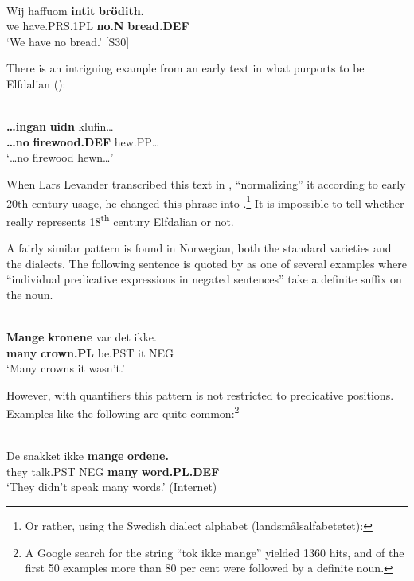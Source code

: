 \ea \label{} 
\\
\gll Wij  haffuom  \textbf{intit} \textbf{brödith.}\\
we  have.PRS.1PL  \textbf{no.N} \textbf{bread.DEF}\\
\glt ‘We have no bread.’ [S30]

\z

There is an intriguing example from an early text in what purports to be Elfdalian (\citet{Näsman1733}):

\ea \label{} 
\\
\gll \textbf{…ingan} \textbf{uidn} klufin…\\
\textbf{…no} \textbf{firewood.DEF} hew.PP…\\
\glt ‘…no firewood hewn…’

\z

When Lars Levander transcribed this text in \citet[T117]{Lundell1936}, “normalizing” it according to early 20th century usage, he changed this phrase into .\footnote{ Or rather, using the Swedish dialect alphabet (landsmålsalfabetetet):  }\textit{ }It is impossible to tell whether  really represents 18\textsuperscript{th} century Elfdalian or not. 

A fairly similar pattern is found in Norwegian, both the standard varieties and the dialects. The following sentence is quoted by \citet[302]{FaarlundEtAl1997} as one of several examples where “individual predicative expressions in negated sentences” take a definite suffix on the noun. 

\ea \label{} 
\\
\gll \textbf{Mange} \textbf{  kronene} var  det  ikke.\\
\textbf{many} \textbf{crown.PL} be.PST  it  NEG\\
\glt ‘Many crowns it wasn’t.’

\z

However, with quantifiers this pattern is not restricted to predicative positions. Examples like the following are quite common:\footnote{ A Google search for the string “tok ikke mange” yielded 1360 hits, and of the first 50 examples more than 80 per cent were followed by a definite noun.}

\ea\label{}
\\
\gll De  snakket  ikke   \textbf{mange} \textbf{  ordene.}\\ %
		they  talk.PST  NEG  \textbf{many} \textbf{word.PL.DEF}\\
\glt ‘They didn’t speak many words.’ (Internet)

